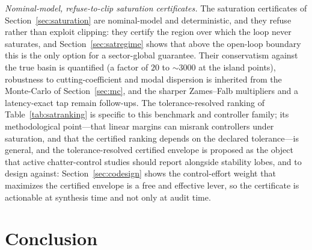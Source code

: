\documentclass[preprint,12pt]{elsarticle}
\begin{document}
\emph{Nominal-model, refuse-to-clip saturation certificates.} The
saturation certificates of Section~\ref{sec:saturation} are
nominal-model and deterministic, and they refuse rather than exploit
clipping: they certify the region over which the loop never saturates,
and Section~\ref{sec:satregime} shows that above the open-loop boundary
this is the only option for a sector-global guarantee. Their
conservatism against the true basin is quantified (a factor of $20$ to
$\sim$3000 at the island points), robustness to cutting-coefficient and
modal dispersion is inherited from the Monte-Carlo of
Section~\ref{sec:mc}, and the sharper Zames--Falb multipliers and a
latency-exact tap remain follow-ups. The tolerance-resolved ranking of
Table~\ref{tab:satranking} is specific to this benchmark and controller
family; its methodological point---that linear margins can misrank
controllers under saturation, and that the certified ranking depends on
the declared tolerance---is general, and the tolerance-resolved
certified envelope is proposed as the object that active
chatter-control studies should report alongside stability lobes, and
to design against: Section~\ref{sec:codesign} shows the control-effort
weight that maximizes the certified envelope is a free and effective
lever, so the certificate is actionable at synthesis time and not only
at audit time.

\section{Conclusion}
\label{sec:conclusion}
\end{document}

